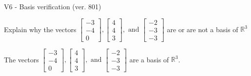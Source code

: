 \begin{exercise}
  \begin{exerciseTitle}V6 - Basis verification (ver. 801)\end{exerciseTitle}
  \begin{exerciseStatement}
    Explain why the vectors \(\left[\begin{array}{r}
-3 \\
-4 \\
0
\end{array}\right] , \left[\begin{array}{r}
4 \\
4 \\
3
\end{array}\right] , \text{ and } \left[\begin{array}{r}
-2 \\
-3 \\
-3
\end{array}\right]\) are or are not a basis of \(\mathbb{R}^3\)	


  \end{exerciseStatement}
  \begin{exerciseAnswer}
   The vectors \(\left[\begin{array}{r}
-3 \\
-4 \\
0
\end{array}\right] , \left[\begin{array}{r}
4 \\
4 \\
3
\end{array}\right] , \text{ and } \left[\begin{array}{r}
-2 \\
-3 \\
-3
\end{array}\right]\) 
  	 are  a basis of \(\mathbb{R}^3\).
  


  \end{exerciseAnswer}
\end{exercise}